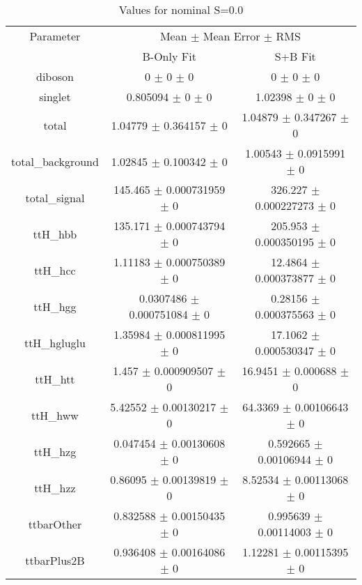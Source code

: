 \begin{table}
\centering
\caption{Values for nominal S=0.0}
\begin{tabular}{ccc}
\toprule
Parameter & \multicolumn{2}{c}{Mean $\pm$ Mean Error $\pm$ RMS}\\
 & B-Only Fit & S+B Fit\\
\midrule
diboson & \num{0} $\pm$ \num{0} $\pm$ \num{0} & \num{0} $\pm$ \num{0} $\pm$ \num{0}\\
singlet & \num{0.805094} $\pm$ \num{0} $\pm$ \num{0} & \num{1.02398} $\pm$ \num{0} $\pm$ \num{0}\\
total & \num{1.04779} $\pm$ \num{0.364157} $\pm$ \num{0} & \num{1.04879} $\pm$ \num{0.347267} $\pm$ \num{0}\\
total\_background & \num{1.02845} $\pm$ \num{0.100342} $\pm$ \num{0} & \num{1.00543} $\pm$ \num{0.0915991} $\pm$ \num{0}\\
total\_signal & \num{145.465} $\pm$ \num{0.000731959} $\pm$ \num{0} & \num{326.227} $\pm$ \num{0.000227273} $\pm$ \num{0}\\
ttH\_hbb & \num{135.171} $\pm$ \num{0.000743794} $\pm$ \num{0} & \num{205.953} $\pm$ \num{0.000350195} $\pm$ \num{0}\\
ttH\_hcc & \num{1.11183} $\pm$ \num{0.000750389} $\pm$ \num{0} & \num{12.4864} $\pm$ \num{0.000373877} $\pm$ \num{0}\\
ttH\_hgg & \num{0.0307486} $\pm$ \num{0.000751084} $\pm$ \num{0} & \num{0.28156} $\pm$ \num{0.000375563} $\pm$ \num{0}\\
ttH\_hgluglu & \num{1.35984} $\pm$ \num{0.000811995} $\pm$ \num{0} & \num{17.1062} $\pm$ \num{0.000530347} $\pm$ \num{0}\\
ttH\_htt & \num{1.457} $\pm$ \num{0.000909507} $\pm$ \num{0} & \num{16.9451} $\pm$ \num{0.000688} $\pm$ \num{0}\\
ttH\_hww & \num{5.42552} $\pm$ \num{0.00130217} $\pm$ \num{0} & \num{64.3369} $\pm$ \num{0.00106643} $\pm$ \num{0}\\
ttH\_hzg & \num{0.047454} $\pm$ \num{0.00130608} $\pm$ \num{0} & \num{0.592665} $\pm$ \num{0.00106944} $\pm$ \num{0}\\
ttH\_hzz & \num{0.86095} $\pm$ \num{0.00139819} $\pm$ \num{0} & \num{8.52534} $\pm$ \num{0.00113068} $\pm$ \num{0}\\
ttbarOther & \num{0.832588} $\pm$ \num{0.00150435} $\pm$ \num{0} & \num{0.995639} $\pm$ \num{0.00114003} $\pm$ \num{0}\\
ttbarPlus2B & \num{0.936408} $\pm$ \num{0.00164086} $\pm$ \num{0} & \num{1.12281} $\pm$ \num{0.00115395} $\pm$ \num{0}\\

\end{tabular}
\end{table}
